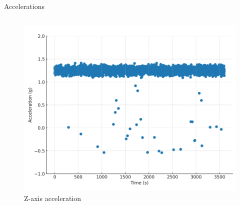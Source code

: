 \begin{frame}{Accelerations}
    \begin{columns}[onlytextwidth]
        \begin{column}{0.46\textwidth}
            \vspace{0.5em}
            \hspace{-2em} %
            \begin{figure}
                \centering
                \includegraphics[height=0.6\textheight,width=1.05\textwidth,keepaspectratio]{images/z_acceleration.png}
                \caption{Z-axis acceleration}
            \end{figure}
        \end{column}


\end{columns}
\end{frame}
